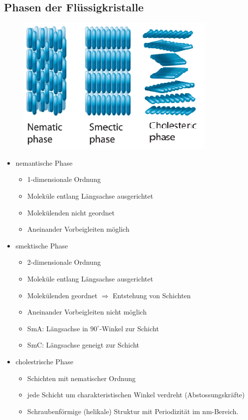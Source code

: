 \subsection{Phasen der Flüssigkristalle}
\begin{figure}[htbp]
	\centering
	\includegraphics[width=0.5\linewidth]{images/11_Phasen.png}
\end{figure}
\begin{itemize}
	\item nemantische Phase
		\begin{itemize}
			\item 1-dimensionale Ordnung
			\item Moleküle entlang Längsachse ausgerichtet
			\item Molekülenden nicht geordnet
			\item Aneinander Vorbeigleiten möglich
		\end{itemize}
	\item smektische Phase
		\begin{itemize}
			\item 2-dimensionale Ordnung
			\item Moleküle entlang Längsachse ausgerichtet
			\item Molekülenden geordnet $\Rightarrow$ Entstehung von Schichten
			\item Aneinander Vorbeigleiten nicht möglich
			\item SmA: Längsachse in $90^\circ$-Winkel zur Schicht
			\item SmC: Längsachse geneigt zur Schicht
		\end{itemize}
	\item cholestrische Phase
		\begin{itemize}
			\item Schichten mit nematischer Ordnung
			\item jede Schicht um charakteristischen Winkel verdreht (Abstossungskräfte)
			\item Schraubenförmige (helikale) Struktur mit Periodizität im nm-Bereich.
		\end{itemize}
\end{itemize}

